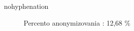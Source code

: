 \begin{hyphenrules}{nohyphenation}
\begin{figure}[H]
\begin{minipage}[t]{.5\linewidth}
\caption{Percento anonymizovania : 12,68 \%}
\label{fig:5.2} 
\end{minipage}\hfill
\begin{minipage}[b]{.5\linewidth}

\end{minipage}
\end{figure}
\end{hyphenrules}
